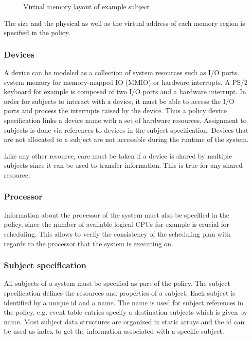\begin{figure}[h]
	\centering
	
	\caption{Virtual memory layout of example subject}
	\label{fig:virt-mem-layout-example}
\end{figure}

The size and the physical as well as the virtual address of each memory region
is specified in the policy.

\subsubsection{Devices}
A device can be modeled as a collection of system resources such as I/O ports,
system memory for memory-mapped IO (MMIO) or hardware interrupts. A PS/2
keyboard for example is composed of two I/O ports and a hardware interrupt.  In
order for subjects to interact with a device, it must be able to access the I/O
ports and process the interrupts raised by the device. Thus a policy device
specification links a device name with a set of hardware resources. Assignment
to subjects is done via references to devices in the subject specification.
Devices that are not allocated to a subject are not accessible during the
runtime of the system.

Like any other resource, care must be taken if a device is shared by multiple
subjects since it can be used to transfer information. This is true for any
shared resource.

\subsubsection{Processor}
Information about the processor of the system must also be specified in the
policy, since the number of available logical CPUs for example is crucial for
scheduling. This allows to verify the consistency of the scheduling plan with
regards to the processor that the system is executing on.

\subsubsection{Subject specification}
All subjects of a system must be specified as part of the policy. The subject
specification defines the resources and properties of a subject. Each subject is
identified by a unique id and a name. The name is used for subject references in
the policy, e.g. event table entries specify a destination subjects which is
given by name. Most subject data structures are organized in static arrays and
the id can be used as index to get the information associated with a specific
subject.

